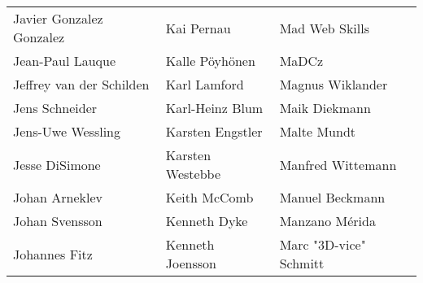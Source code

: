 \begin{tabular}{p{4.5cm}p{4.5cm}p{4.5cm}}
Javier Gonzalez Gonzalez & Kai Pernau & Mad Web Skills \\
Jean-Paul Lauque & Kalle Pöyhönen & MaDCz \\
Jeffrey van der Schilden & Karl Lamford & Magnus Wiklander \\
Jens Schneider & Karl-Heinz Blum & Maik Diekmann \\
Jens-Uwe Wessling & Karsten Engstler & Malte Mundt \\
Jesse DiSimone & Karsten Westebbe & Manfred Wittemann \\
Johan Arneklev & Keith McComb & Manuel Beckmann \\
Johan Svensson & Kenneth Dyke & Manzano Mérida \\
Johannes Fitz & Kenneth Joensson & Marc "3D-vice" Schmitt \\
\end{tabular}
\newpage
\setlength{\tabcolsep}{1mm}

